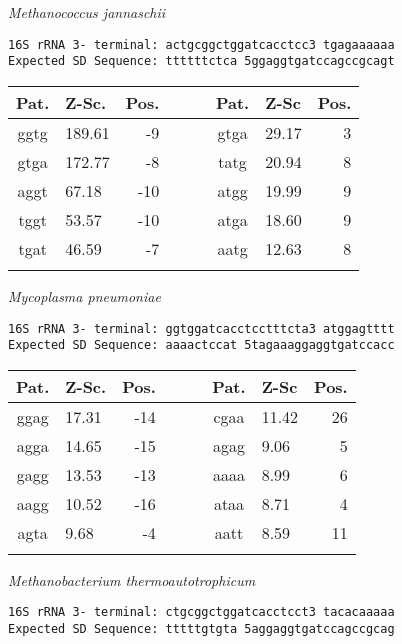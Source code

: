 \vspace{1em}
\noindent
{\it Methanococcus jannaschii    }
\begin{verbatim}
16S rRNA 3- terminal: actgcggctggatcacctcc3 tgagaaaaaa
Expected SD Sequence: ttttttctca 5ggaggtgatccagccgcagt
\end{verbatim}

\noindent
\begin{center}
\begin{tabular}{clrcclr}
Pat. & Z-Sc. & Pos. & \verb+   + & Pat. & Z-Sc & Pos. \\
\hline
ggtg & 189.61 & -9 &  & gtga & 29.17 & 3 \\
gtga & 172.77 & -8 &  & tatg & 20.94 & 8 \\
aggt & 67.18 & -10 &  & atgg & 19.99 & 9 \\
tggt & 53.57 & -10 &  & atga & 18.60 & 9 \\
tgat & 46.59 & -7 &  & aatg & 12.63 & 8 \\
    &     \\
\end{tabular}
\end{center}

\vspace{1em}
\noindent
{\it Mycoplasma pneumoniae    }
\begin{verbatim}
16S rRNA 3- terminal: ggtggatcacctcctttcta3 atggagtttt
Expected SD Sequence: aaaactccat 5tagaaaggaggtgatccacc
\end{verbatim}

\noindent
\begin{center}
\begin{tabular}{clrcclr}
Pat. & Z-Sc. & Pos. & \verb+   + & Pat. & Z-Sc & Pos. \\
\hline
ggag & 17.31 & -14 &  & cgaa & 11.42 & 26 \\
agga & 14.65 & -15 &  & agag & 9.06 & 5 \\
gagg & 13.53 & -13 &  & aaaa & 8.99 & 6 \\
aagg & 10.52 & -16 &  & ataa & 8.71 & 4 \\
agta & 9.68 & -4 &  & aatt & 8.59 & 11 \\
    &     \\
\end{tabular}
\end{center}

\vspace{1em}
\noindent
{\it Methanobacterium thermoautotrophicum    }
\begin{verbatim}
16S rRNA 3- terminal: ctgcggctggatcacctcct3 tacacaaaaa
Expected SD Sequence: tttttgtgta 5aggaggtgatccagccgcag
\end{verbatim}


